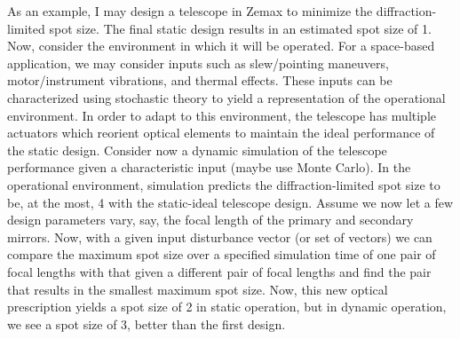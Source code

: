 \documentclass{article}
\begin{document}
As an example, I may design a telescope in Zemax to minimize the diffraction-limited spot size. The final static design results in an estimated spot size of 1. Now, consider the environment in which it will be operated. For a space-based application, we may consider inputs such as slew/pointing maneuvers, motor/instrument vibrations, and thermal effects. These inputs can be characterized using stochastic theory to yield a representation of the operational environment. In order to adapt to this environment, the telescope has multiple actuators which reorient optical elements to maintain the ideal performance of the static design. Consider now a dynamic simulation of the telescope performance given a characteristic input (maybe use Monte Carlo). In the operational environment, simulation predicts the diffraction-limited spot size to be, at the most, 4 with the static-ideal telescope design. Assume we now let a few design parameters vary, say, the focal length of the primary and secondary mirrors. Now, with a given input disturbance vector (or set of vectors) we can compare the maximum spot size over a specified simulation time of one pair of focal lengths with that given a different pair of focal lengths and find the pair that results in the smallest maximum spot size. Now, this new optical prescription yields a spot size of 2 in static operation, but in dynamic operation, we see a spot size of 3, better than the first design.
		
\end{document}
